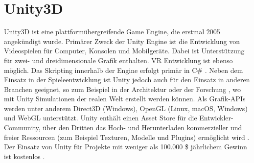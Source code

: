 
\section{Unity3D}
Unity3D ist eine plattformübergreifende Game Engine, die erstmal 2005 angekündigt wurde.
Primärer Zweck der Unity Engine ist die Entwicklung von Videospielen für Computer, Konsolen und Mobilgeräte.
Dabei ist Unterstützung für zwei- und dreidimensionale Grafik enthalten.
VR Entwicklung ist ebenso möglich.
Das Skripting innerhalb der Engine erfolgt primär in C\# \cite{freecodecamp.unityIntroduction}.
Neben dem Einsatz in der Spieleentwicklung ist Unity jedoch auch für den Einsatz in anderen Branchen geeignet, so zum Beispiel in der Architektur oder der Forschung \cite[30]{waidner.2020}, wo mit Unity Simulationen der realen Welt erstellt werden können.
Als Grafik-APIs werden unter anderem Direct3D (Windows), OpenGL (Linux, macOS, Windows) und WebGL unterstützt.
Unity enthält einen Asset Store für die Entwickler-Community, über den Dritten das Hoch- und Herunterladen kommerzieller und freier Ressourcen (zum Beispiel Texturen, Modelle und Plugins) ermöglicht wird \cite{freecodecamp.unityIntroduction}.
Der Einsatz von Unity für Projekte mit weniger als 100.000 \$ jährlichem Gewinn ist kostenlos \cite{unityPersonal}.


